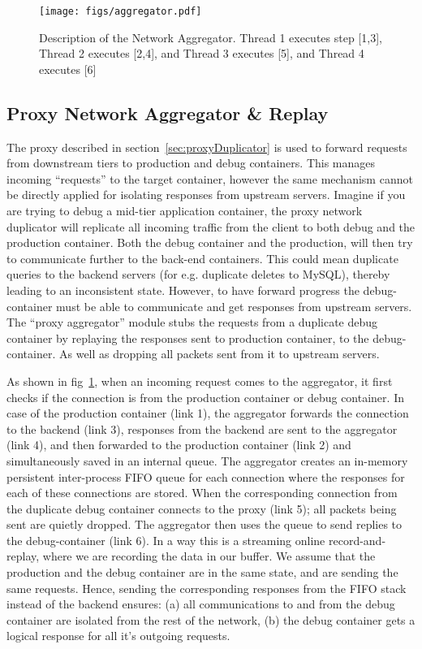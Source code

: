 \begin{figure}[ht]
  \begin{center}
    \texttt{[image: figs/aggregator.pdf]}
    \caption{Description of the Network Aggregator. Thread 1 executes step [1,3], Thread 2 executes [2,4], and Thread 3 executes [5], and Thread 4 executes [6]}
    \label{fig:aggregator}
  \end{center}
\end{figure}

\subsection{Proxy Network Aggregator \& Replay }
\label{sec:proxyAggregator}
The proxy described in section~\ref{sec:proxyDuplicator} is used to forward requests from downstream tiers to production and debug containers.
This manages incoming ``requests'' to the target container, however the same mechanism cannot be directly applied for isolating responses from upstream servers.
Imagine if you are trying to debug a mid-tier application container, the proxy network duplicator will replicate all incoming traffic from the client to both debug and the production container. 
Both the debug container and the production, will then try to communicate further to the back-end containers.
This could mean duplicate queries to the backend servers (for e.g. duplicate deletes to MySQL), thereby leading to an inconsistent state.
However, to have forward progress the debug-container must be able to communicate and get responses from upstream servers.
The ``proxy aggregator'' module stubs the requests from a duplicate debug container by replaying the responses sent to production container, to the debug-container.
As well as dropping all packets sent from it to upstream servers.

As shown in  fig~\ref{fig:aggregator}, when an incoming request comes to the aggregator, it first checks if the connection is from the production container or debug container. 
In case of the production container (link 1), the aggregator forwards the connection to the backend (link 3), responses from the backend are sent to the aggregator (link 4), and then forwarded to the production container (link 2) and simultaneously saved in an internal queue.
The aggregator creates an in-memory persistent inter-process FIFO queue for each connection where the responses for each of these connections are stored.
When the corresponding connection from the duplicate debug container connects to the proxy (link 5); all packets being sent are quietly dropped. 
The aggregator then uses the queue to send replies to the debug-container (link 6).
In a way this is a streaming online record-and-replay, where we are recording the data in our buffer.
We assume that the production and the debug container are in the same state, and are sending the same requests. 
Hence, sending the corresponding responses from the FIFO stack instead of the backend ensures: (a) all communications to and from the debug container are isolated from the rest of the network, (b) the debug container gets a logical response for all it's outgoing requests.

